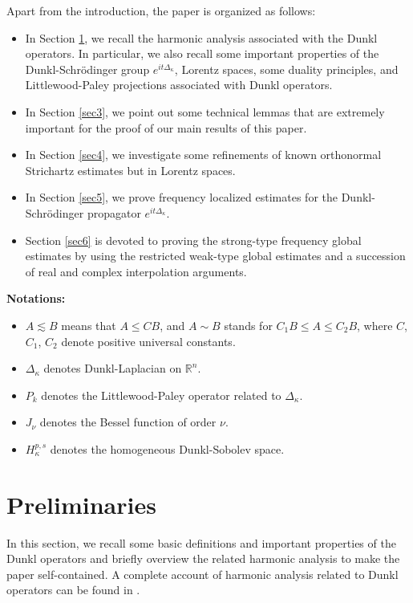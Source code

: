 \documentclass[a4paper,11pt, reqno]{amsart}
\numberwithin{equation}{section}
\theoremstyle{plain}
\theoremstyle{definition}
\theoremstyle{remark}
\begin{document}
 
	
	 
	
Apart from the introduction, the paper is organized as follows: 
\begin{itemize}
	\item In Section \ref{sec2}, we recall the harmonic analysis associated with the Dunkl operators.  In particular, we also recall some important properties of the Dunkl-Schr\"{o}dinger group $e^{it\Delta_\kappa}$, Lorentz spaces, some duality principles, and Littlewood-Paley projections associated with Dunkl operators. 
	\item  In Section \ref{sec3}, we point out some technical lemmas that are extremely important for the proof of our main results of this paper.
	\item   In Section \ref{sec4}, we investigate some refinements of known orthonormal Strichartz estimates but in Lorentz spaces. 
	\item    In Section \ref{sec5}, we prove frequency localized estimates for the Dunkl-Schr\"odinger propagator $e^{it\Delta_\kappa}$.
	\item   Section \ref{sec6} is devoted to proving the strong-type frequency global estimates by using the restricted weak-type global estimates  and a
	succession of  real and complex interpolation arguments.
\end{itemize}  
\noindent \textbf{Notations:}
\begin{itemize}
\item  $A\lesssim B$ means that $A\leqslant CB$, and $A\sim B$ stands for $C_1B\leq A\leq C_2B$, where $C$, $C_1$, $C_2$ denote positive universal constants.
\item $\Delta_\kappa$ denotes Dunkl-Laplacian on $\mathbb{R}^n$.
\item $ P_k$ denotes the Littlewood-Paley operator related to $\Delta_\kappa$.
\item $J_\nu$ denotes the Bessel
function of order $\nu.$ 
\item    $H_\kappa^{p,s}$ denotes the homogeneous Dunkl-Sobolev space.
\end{itemize}


\section{Preliminaries}\label{sec2}
In this section, we recall some basic definitions and important properties of the Dunkl operators and briefly overview the related harmonic analysis to make the paper self-contained. A complete account of harmonic analysis related to Dunkl operators can be found in \cite{ros,ben,Ratna3, Mejjaoli2009,MS,Jiu-Li}.  
\end{document}
